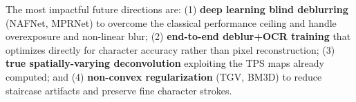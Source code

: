 \documentclass[12pt,a4paper]{article}
\begin{document}
The most impactful future directions are: (1) \textbf{deep learning blind deblurring}
(NAFNet, MPRNet) to overcome the classical performance ceiling and handle overexposure
and non-linear blur; (2) \textbf{end-to-end deblur+OCR training} that optimizes directly
for character accuracy rather than pixel reconstruction; (3) \textbf{true spatially-varying
deconvolution} exploiting the TPS maps already computed; and (4) \textbf{non-convex
regularization} (TGV, BM3D) to reduce staircase artifacts and preserve fine character strokes.

\end{document}

